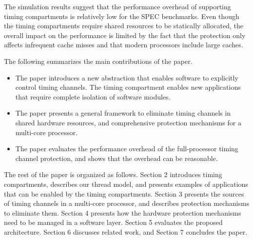 The simulation results suggest that the performance overhead of supporting
timing compartments is relatively low for the SPEC benchmarks. Even though
the timing compartments require shared resources to be statically 
allocated, the overall impact on the performance is limited by the fact
that the protection only affects infrequent cache misses and that modern
processors include large caches. 

The following summarizes the main contributions of the paper.

\begin{itemize}
\item The paper introduces a new abstraction that enables software to
explicitly control timing channels. The timing compartment enables new
applications that require complete isolation of software modules.
\item The paper presents a general framework to eliminate timing channels
in shared hardware resources, and comprehensive protection mechanisms for
a multi-core processor.
\item The paper evaluates the performance overhead of the full-processor
timing channel protection, and shows that the overhead can be reasonable.
\end{itemize}

The rest of the paper is organized as follows.
Section 2 introduces timing compartments, describes our thread model, and 
presents examples of applications that can be enabled by the timing compartments.
Section 3 presents the sources of timing channels in a multi-core processor, and
describes protection mechanisms to eliminate them. 
Section 4 presents how the hardware protection mechanisms need to be managed
in a software layer.
Section 5 evaluates the proposed architecture. Section 6 discusses related
work, and Section 7 concludes the paper.
